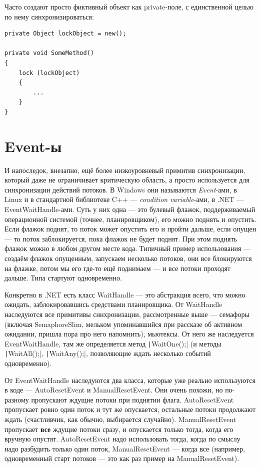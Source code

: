 \documentclass{../../text-style}
\begin{document}
Часто создают просто фиктивный объект как private-поле, с единственной целью по нему синхронизироваться:
\begin{verbatim}
private Object lockObject = new();

private void SomeMethod() 
{
    lock (lockObject) 
    {
        ...
    }
}
\end{verbatim}

\section{Event-ы}

И напоследок, внезапно, ещё более низкоуровневый примитив синхронизации, который даже не ограничивает критическую область, а просто используется для синхронизации действий потоков. В Windows они называются \textit{Event}-ами, в Linux и в стандартной библиотеке C++ --- \textit{condition variable}-ами, в .NET --- EventWaitHandle-ами. Суть у них одна --- это булевый флажок, поддерживаемый операционной системой (точнее, планировщиком), его можно поднять и опустить. Если флажок поднят, то поток может опустить его и пройти дальше, если опущен --- то поток заблокируется, пока флажок не будет поднят. При этом поднять флажок можно в любом другом месте кода. Типичный пример использования --- создаём флажок опущенным, запускаем несколько потоков, они все блокируются на флажке, потом мы его где-то ещё поднимаем --- и все потоки проходят дальше. Типа стартуют одновременно.

Конкретно в .NET есть класс WaitHandle --- это абстракция всего, что можно ожидать, заблокировавшись средствами планировщика. От WaitHandle наследуются все примитивы синхронизации, рассмотренные выше --- семафоры (включая SemaphoreSlim, мельком упоминавшийся при рассказе об активном ожидании, пришла пора про него напомнить), мьютексы. От него же наследуется EventWaitHandle, там же определяется метод \texttt|WaitOne();| (и методы \texttt|WaitAll();|, \texttt|WaitAny();|, позволяющие ждать несколько событий одновременно).

От EventWaitHandle наследуются два класса, которые уже реально используются в коде --- AutoResetEvent и ManualResetEvent. Они очень похожи, но по-разному пропускают ждущие потоки при поднятии флага. AutoResetEvent пропускает ровно один поток и тут же опускается, остальные потоки продолжают ждать (счастливчик, как обычно, выбирается случайно). ManualResetEvent пропускает \textbf{все} ждущие потоки сразу, и опускается только тогда, когда его вручную опустят. AutoResetEvent надо использовать тогда, когда по смыслу надо разбудить только один поток, ManualResetEvent --- когда все  (например, одновременный старт потоков --- это как раз пример на ManualResetEvent).
\end{document}
